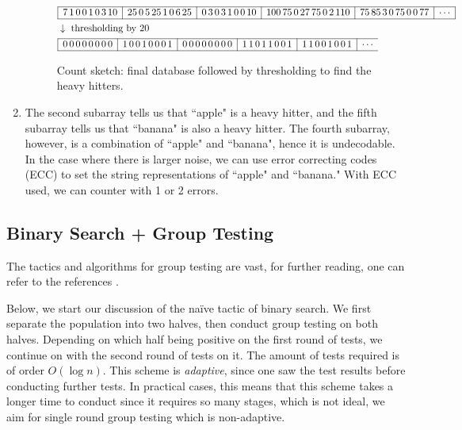 \begin{enumerate}[label=(\arabic*)]
\begin{figure}[H]
        \centering
        \begin{align*}
        &\begin{array}{|c|c|c|c|c|c|c}
            \hline
            7\,1\,0\,0\,1\,0\,3\,10 &
            25\,0\,5\,25\,1\,0\,6\,25 &
            0\,3\,0\,3\,1\,0\,0\,10 &
            100\,75\,0\,27\,75\,0\,2\,110 &
            75\,85\,3\,0\,75\,0\,0\,77 &
            \cdots \\
            \hline
        \end{array} \\
        &\downarrow \text{ thresholding by 20} \\
        &\begin{array}{|c|c|c|c|c|c}
            \hline
            0\,0\,0\,0\,0\,0\,0\,0 &
            1\,0\,0\,1\,0\,0\,0\,1 &
            0\,0\,0\,0\,0\,0\,0\,0 &
            1\,1\,0\,1\,1\,0\,0\,1 &
            1\,1\,0\,0\,1\,0\,0\,1 &
            \cdots \\
            \hline
        \end{array}
        \end{align*} 
        \caption{Count sketch: final database followed by thresholding to find the heavy hitters.}
        \label{fig:w12_database_summary_2}
    \end{figure}
    \item The second subarray tells us that ``apple" is a heavy hitter, and the fifth subarray tells us that ``banana" is also a heavy hitter. The fourth subarray, however, is a combination of ``apple" and ``banana", hence it is undecodable. In the case where there is larger noise, we can use error correcting codes (ECC) to set the string representations of ``apple" and ``banana." With ECC used, we can counter with 1 or 2 errors.
\end{enumerate}


\subsection{Binary Search + Group Testing} \label{sec:w12_bin_GT}
The tactics and algorithms for group testing are vast, for further reading, one can refer to the references \cite{CombinatorialGT_SparseRecovery,NoisyNonadaptiveGT,Quickly_Decodable_GT}.

Below, we start our discussion of the na\"ive tactic of binary search. We first separate the population into two halves, then conduct group testing on both halves. Depending on which half being positive on the first round of tests, we continue on with the second round of tests on it. The amount of tests required is of order $O(\log n)$. This scheme is \textit{adaptive}, since one saw the test results before conducting further tests. In practical cases, this means that this scheme takes a longer time to conduct since it requires so many stages, which is not ideal, we aim for single round group testing which is non-adaptive.

